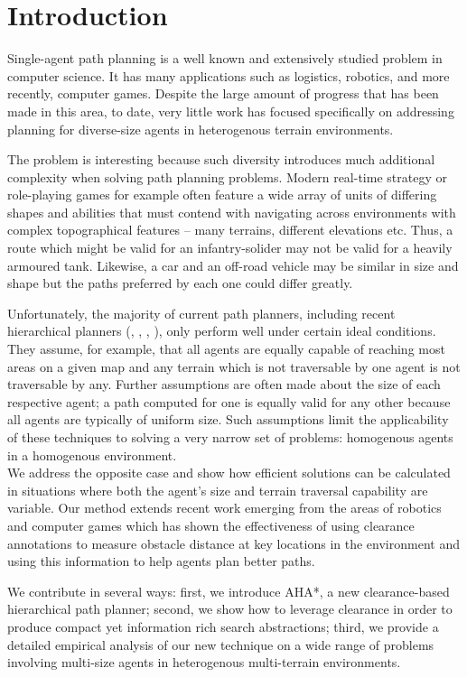 \section{Introduction}
Single-agent path planning is a well known and extensively studied problem in computer science.
It has many applications such as logistics, robotics, and more recently, computer games. 
Despite the large amount of progress that has been made in this area, to date, very little work has focused specifically on addressing planning for diverse-size agents in heterogenous terrain environments. 
\par \indent
The problem is interesting because such diversity introduces much additional complexity when solving path planning problems.
Modern real-time strategy or role-playing games for example often feature a wide array of units of differing shapes and abilities that must contend with navigating across environments with complex topographical features -- many terrains, different elevations etc. 
Thus, a route which might be valid for an infantry-solider may not be valid for a heavily armoured tank. 
Likewise, a car and an off-road vehicle may be similar in size and shape but the paths preferred by each one could differ greatly. 
\par \indent
Unfortunately, the majority of current path planners, including recent hierarchical planners (\cite{botea04}, \cite{sturtevant05}, \cite{demyen07}, \cite{geraerts07}), only perform well under certain ideal conditions. 
They assume, for example, that all agents are equally capable of reaching most areas on a given map and any terrain which is not traversable by one agent is not traversable by any. 
Further assumptions are often made about the size of each respective agent; a path computed for one is equally valid for any other because all agents are typically of uniform size. 
Such assumptions limit the applicability of these techniques to solving a very narrow set of problems: homogenous agents in a homogenous environment. \\
We address the opposite case and show how efficient solutions can be calculated in situations where both the agent's size and terrain traversal capability are variable. 
Our method extends recent work emerging from the areas of robotics and computer games which has shown the effectiveness of using clearance annotations to measure obstacle distance at key locations in the environment and using this information to help agents plan better paths. 
\par \indent
We contribute in several ways: first, we introduce AHA*, a new clearance-based hierarchical path planner; second, we show how to leverage clearance in order to produce compact yet information rich search abstractions; third, we provide a detailed empirical analysis of our new technique on a wide range of problems involving multi-size agents in heterogenous multi-terrain environments.
